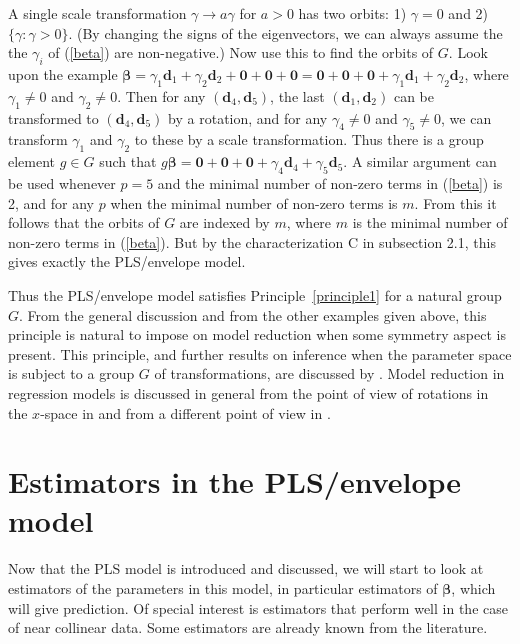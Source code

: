 \documentclass[a4paper, 11pt]{article}
\begin{document}
A single scale transformation $\gamma\rightarrow a\gamma$ for $a>0$ has two orbits: 1) $\gamma=0$ and 2) $\{\gamma: \gamma>0\}$. (By changing the signs of the eigenvectors, we can always assume the the $\gamma_i$ of (\ref{beta}) are non-negative.) Now use this to find the orbits of $G$. Look upon the example $\bm{\beta}=\gamma_1\bm{d}_1+\gamma_2\bm{d}_2+\bm{0}+\bm{0}+\bm{0}=\bm{0}+\bm{0}+\bm{0}+\gamma_1\bm{d}_1
+\gamma_2\bm{d}_2$, where $\gamma_1\ne 0$ and $\gamma_2\ne 0$. Then for any $(\bm{d}_4,\bm{d}_5)$, the last  $(\bm{d}_1,\bm{d}_2)$ can be transformed to $(\bm{d}_4,\bm{d}_5)$ by a rotation, and for any $\gamma_4\ne 0$ and $\gamma_5\ne 0$, we can transform $\gamma_1$ and $\gamma_2$ to these by a scale transformation. Thus there is a group element $g\in G$ such that $g\bm{\beta}=\bm{0}+\bm{0}+\bm{0}+\gamma_4\bm{d}_4
+\gamma_5\bm{d}_5$. A similar argument can be used whenever $p=5$ and the minimal number of non-zero terms in (\ref{beta}) is 2, and for any $p$ when the minimal number of non-zero terms is $m$.  From this it follows that the orbits of $G$ are indexed by $m$, where $m$ is the minimal number of non-zero terms in (\ref{beta}). But by the characterization C in subsection 2.1, this gives exactly the PLS/envelope model.

Thus the PLS/envelope model satisfies Principle~\ref{principle1} for a natural group $G$. From the general discussion and from the other examples given above, this principle is natural to impose on model reduction when some symmetry aspect is present. This principle, and further results on inference when the parameter space is subject to a group $G$ of transformations, are discussed by \citet{helland2004statistical, helland2010steps}. Model reduction in regression models is discussed in general from the point of view of rotations in the $x$-space in \citet{helland2001reduction} and from a different point of view in \citet{helland2000model}.


\section{Estimators in the PLS/envelope model}

Now that the PLS model is introduced and discussed, we will start to look at estimators of the parameters in this model, in particular estimators of $\bm{\beta}$, which will give prediction. Of special interest is estimators that perform well in the case of near collinear data. Some estimators are already known from the literature.
\end{document}
